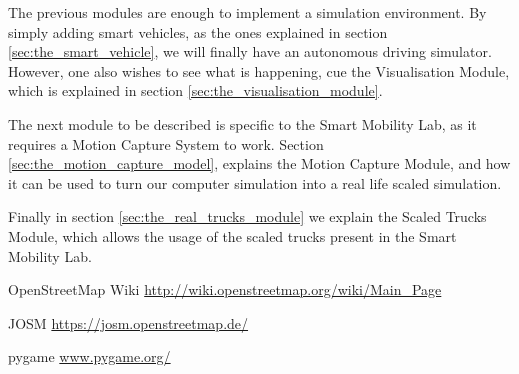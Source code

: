 \documentclass[10pt,a4paper]{article}
\begin{document}
The previous modules are enough to implement a simulation environment. By simply adding smart vehicles, as the ones explained in section \ref{sec:the_smart_vehicle}, we will finally have an autonomous driving simulator. However, one also wishes to see what is happening, cue the Visualisation Module, which is explained in section \ref{sec:the_visualisation_module}.

The next module to be described is specific to the Smart Mobility Lab, as it requires a Motion Capture System to work. Section \ref{sec:the_motion_capture_model}, explains the Motion Capture Module, and how it can be used to turn our computer simulation into a real life scaled simulation.

Finally in section \ref{sec:the_real_trucks_module} we explain the Scaled Trucks Module, which allows the usage of the scaled trucks present in the Smart Mobility Lab.



















\begin{thebibliography}{9}

OpenStreetMap Wiki \url{http://wiki.openstreetmap.org/wiki/Main_Page}

JOSM \url{https://josm.openstreetmap.de/}

pygame \url{www.pygame.org/}

\end{thebibliography}
\end{document}
